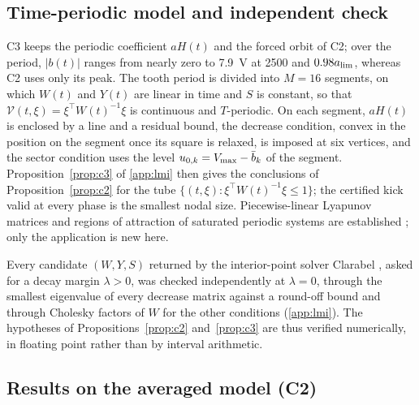 \subsection{Time-periodic model and independent check}\label{sec:cert-periodic}\label{sec:cert-check}

C3 keeps the periodic coefficient $aH(t)$ and the forced orbit of C2; over the period, $\lvert b(t)\rvert$ ranges from nearly zero to \SI{7.9}{\volt} at \SI{2500}{\rpm} and $0.98a_{\lim}$, whereas C2 uses only its peak. The tooth period is divided into $M=16$ segments, on which $W(t)$ and $Y(t)$ are linear in time and $S$ is constant, so that $\mathcal V(t,\xi)=\xi^\top W(t)^{-1}\xi$ is continuous and $T$-periodic. On each segment, $aH(t)$ is enclosed by a line and a residual bound, the decrease condition, convex in the position on the segment once its square is relaxed, is imposed at six vertices, and the sector condition uses the level $u_{0,k}=V_{\max}-\bar b_k$ of the segment. Proposition~\ref{prop:c3} of \ref{app:lmi} then gives the conclusions of Proposition~\ref{prop:c2} for the tube $\{(t,\xi):\xi^\top W(t)^{-1}\xi\le1\}$; the certified kick valid at every phase is the smallest nodal size. Piecewise-linear Lyapunov matrices and regions of attraction of saturated periodic systems are established \citep{allerhand2011robust,briat2013clock,li2015periodic,zhou2011periodic,yang2015periodic}; only the application is new here.

Every candidate $(W,Y,S)$ returned by the interior-point solver Clarabel \citep{goulart2024clarabel}, asked for a decay margin $\lambda>0$, was checked independently at $\lambda=0$, through the smallest eigenvalue of every decrease matrix against a round-off bound and through Cholesky factors of $W$ for the other conditions (\ref{app:lmi}). The hypotheses of Propositions~\ref{prop:c2} and~\ref{prop:c3} are thus verified numerically, in floating point rather than by interval arithmetic.

\subsection{Results on the averaged model (C2)}\label{sec:cert-c2}

